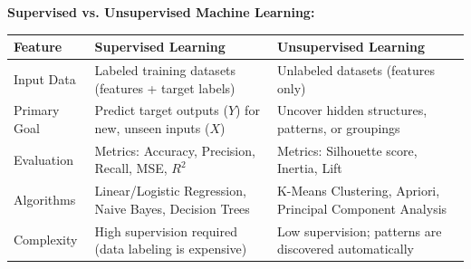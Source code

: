 \documentclass[12pt,a4paper]{article}
\renewcommand{\arraystretch}{1.45}
\begin{document}
\begin{tcolorbox}[tikzbox, title={\textbf{Comparison Snapshot}}]
\textbf{Supervised vs. Unsupervised Machine Learning:}\par\vspace{6pt}\noindent
{\renewcommand{\arraystretch}{1.4}%
\begin{tabularx}{\linewidth}{|B{3.2cm}|Y|Y|}
\hline
\textbf{Feature} & \textbf{Supervised Learning} & \textbf{Unsupervised Learning} \\
\hline
Input Data & Labeled training datasets (features + target labels) & Unlabeled datasets (features only) \\
\hline
Primary Goal & Predict target outputs ($Y$) for new, unseen inputs ($X$) & Uncover hidden structures, patterns, or groupings \\
\hline
Evaluation & Metrics: Accuracy, Precision, Recall, MSE, $R^2$ & Metrics: Silhouette score, Inertia, Lift \\
\hline
Algorithms & Linear/Logistic Regression, Naive Bayes, Decision Trees & K-Means Clustering, Apriori, Principal Component Analysis \\
\hline
Complexity & High supervision required (data labeling is expensive) & Low supervision; patterns are discovered automatically \\
\hline
\end{tabularx}}
\end{tcolorbox}
\end{document}
